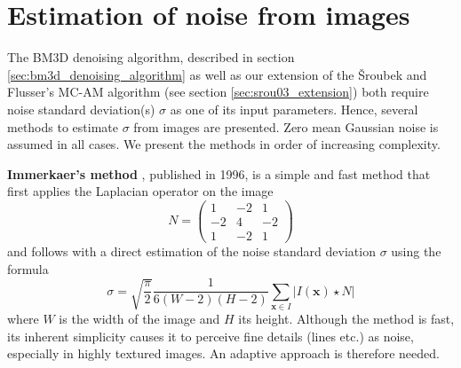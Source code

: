 \documentclass[12pt,notitlepage]{report}
\begin{document}
\section{Estimation of noise from images}
\label{sec:estimation_of_noise_from_images}

The BM3D denoising algorithm, described in section \ref{sec:bm3d_denoising_algorithm} as well as our extension of the Šroubek and Flusser's MC-AM algorithm (see section \ref{sec:srou03_extension}) both require noise standard deviation(s) $\sigma$ as one of its input parameters. Hence, several methods to estimate $\sigma$ from images are presented. Zero mean Gaussian noise is assumed in all cases. We present the methods in order of increasing complexity. 

\noindent \textbf{Immerkaer's method} \cite{imm96}, published in 1996, is a simple and fast method that first applies the Laplacian operator on the image 
\begin{equation}
\label{eq:imm96_matrix}
	N = 
	\begin{pmatrix}
	 1&-2&1 \\
	-2&4&-2 \\
	 1&-2&1 
	\end{pmatrix} 
\end{equation}
and follows with a direct estimation of the noise standard deviation $\sigma$ using the formula
\begin{equation}
\label{eq:imm96_sigma}
	\sigma = \sqrt{\frac{\pi}{2}} \frac{1}{6(W-2)(H-2)}\sum_{\mathbf{x} \in I}^{}\left|I(\mathbf{x}) \star N \right|  
\end{equation}
where $W$ is the width of the image and $H$ its height. Although the method is fast, its inherent simplicity causes it to perceive fine details (lines etc.) as noise, especially in highly textured images. An adaptive approach is therefore needed. 
\end{document}
